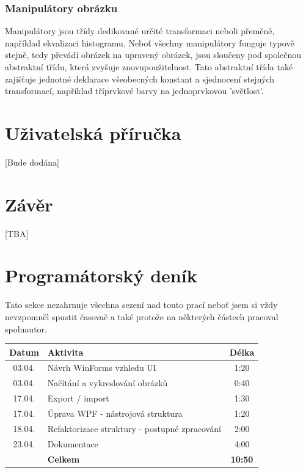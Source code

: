 \documentclass[12pt,a4paper]{article}
\let\oldsection\section
\renewcommand\section{\clearpage\oldsection}
\begin{document}
\subsubsection{Manipulátory obrázku}
Manipulátory jsou třídy dedikované určité transformaci neboli přeměně, například ekvalizaci histogramu. Neboť všechny manipulátory funguje typově stejně, tedy převádí obrázek na upravený obrázek, jsou sloučeny pod společnou abstraktní třídu, která zvyšuje znovupoužitelnost. Tato abstraktní třída také zajišťuje jednotné deklarace všeobecných konstant a sjednocení stejných transformací, například tříprvkové barvy na jednoprvkovou 'světlost'.

\section{Uživatelská příručka}
{[}Bude dodána{]}
\section{Závěr}
{[}TBA{]}

\section*{Programátorský deník}
Tato sekce nezahrnuje všechna sezení nad touto prací neboť jsem si vždy nevzpomněl spustit časovač a také protože na některých částech pracoval spoluautor.
\begin{table}[h!]
\centering
\begin{tabular}
{| c | >{\centering}m{12cm} | c |} \hline
Datum & Aktivita & Délka \\ \hline

03.04. & Návrh WinForms vzhledu UI & 1:20 \\ \hline
03.04. & Načítání a vykreslování obrázků & 0:40 \\ \hline
17.04. & Export / import & 1:30 \\ \hline
17.04. & Úprava WPF - nástrojová struktura & 1:20 \\ \hline
18.04. & Refaktorizace struktury - postupné zpracování & 2:00 \\ \hline
23.04. & Dokumentace & 4:00 \\ \hline
\hline
 & \textbf{Celkem} & \textbf{10:50} \\ \hline

\end{tabular}
\end{table}

\end{document}
